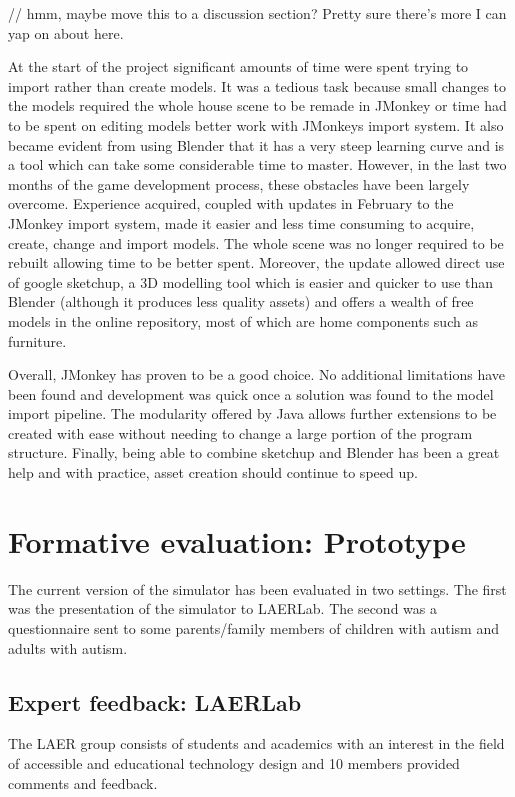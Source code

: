 \documentclass[11pt]{report}
\begin{document}
// hmm, maybe move this to a discussion section? Pretty sure there's more I can yap on about here. 

At the start of the project significant amounts of time were spent trying to import rather than create models. It was a tedious task because small changes to the models required the whole house scene to be remade in JMonkey or
time had to be spent on editing models better work with JMonkeys import system. It also became evident from using Blender that it has a very steep learning curve and is a tool which can take some considerable time to master.
However, in the last two months of the game development process, these obstacles have been largely overcome. Experience acquired, coupled with updates in February to the JMonkey import system, made it easier and less
time consuming to acquire, create, change and import models. The whole scene was no longer required to be rebuilt allowing time to be better spent. Moreover, the update allowed direct use of google sketchup, a 3D modelling
tool which is easier and quicker to use than Blender (although it produces less quality assets) and offers a wealth of free models in the online repository, most of which are home components such as furniture.

Overall, JMonkey has proven to be a good choice. No additional limitations have been found and development was quick once a solution was found to the model import pipeline. The modularity offered by Java allows
further extensions to be created with ease without needing to change a large portion of the program structure. Finally, being able to combine sketchup and Blender has been a great help and with practice, asset creation should
continue to speed up.

\chapter{Formative evaluation: Prototype}
The current version of the simulator has been evaluated in two settings. The first was the presentation of the simulator to LAERLab. The second was a questionnaire sent to some parents/family members of children with autism and adults with autism.

\section{Expert feedback: LAERLab}
The LAER group consists of students and academics with an interest in the field of accessible and educational technology design and 10 members provided comments and feedback.
\end{document}
